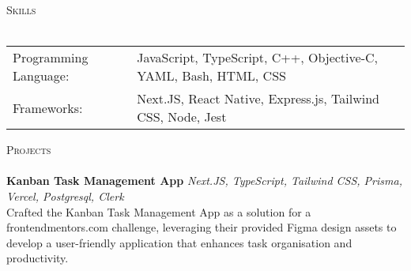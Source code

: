 \documentclass[a4paper]{article}
\newcommand{\lineunder} {
    \vspace*{-8pt} \\
    \hspace*{-18pt} \hrulefill \\
}
\newcommand{\header} [1] {
    {\hspace*{-18pt}\vspace*{6pt} \textsc{#1}}
    \vspace*{-6pt} \lineunder
}
\begin{document}
\header{Skills}
\begin{tabular}{V{5cm} @{\hskip 0.6cm} V{12cm}}
Programming Language: & JavaScript, TypeScript, C++, Objective-C, YAML, Bash, HTML, CSS \\
Frameworks: & Next.JS, React Native, Express.js, Tailwind CSS, Node, Jest \\
\end{tabular}
\vspace{2mm}

\header{Projects}
      {\textbf{Kanban Task Management App}} {\sl Next.JS, TypeScript, Tailwind CSS, Prisma, Vercel, Postgresql, Clerk} \\
Crafted the Kanban Task Management App as a solution for a frontendmentors.com challenge, leveraging their provided Figma design assets to develop a user-friendly application that enhances task organisation and productivity.\\
\vspace*{2mm}

    
\end{document}
